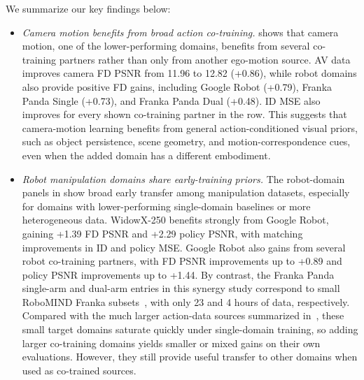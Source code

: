 We summarize our key findings below:



\begin{itemize}[leftmargin=*]
    \item \textit{Camera motion benefits from broad action co-training.}
     shows that camera motion, one of the lower-performing domains, benefits from several co-training partners rather than only from another ego-motion source.
    AV data improves camera FD PSNR from 11.96 to 12.82 (+0.86), while robot domains also provide positive FD gains, including Google Robot (+0.79), Franka Panda Single (+0.73), and Franka Panda Dual (+0.48).
    ID MSE also improves for every shown co-training partner in the row.
    This suggests that camera-motion learning benefits from general action-conditioned visual priors, such as object persistence, scene geometry, and motion-correspondence cues, even when the added domain has a different embodiment.

    \item \textit{Robot manipulation domains share early-training priors.}
    The robot-domain panels in  show broad early transfer among manipulation datasets, especially for domains with lower-performing single-domain baselines or more heterogeneous data.
    WidowX-250 benefits strongly from Google Robot, gaining +1.39 FD PSNR and +2.29 policy PSNR, with matching improvements in ID and policy MSE.
    Google Robot also gains from several robot co-training partners, with FD PSNR improvements up to +0.89 and policy PSNR improvements up to +1.44.
    By contrast, the Franka Panda single-arm and dual-arm entries in this synergy study correspond to small RoboMIND Franka subsets~\citep{wu2024robomind}, with only 23 and 4 hours of data, respectively. Compared with the much larger action-data sources summarized in~, these small target domains saturate quickly under single-domain training, so adding larger co-training domains yields smaller or mixed gains on their own evaluations. However, they still provide useful transfer to other domains when used as co-trained sources.


\end{itemize}
